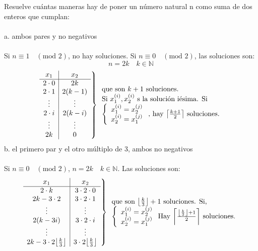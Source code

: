 \documentclass{article}
\DeclarePairedDelimiter{\ceil}{\lceil}{\rceil}
\DeclarePairedDelimiter{\floor}{\lfloor}{\rfloor}
\begin{document}
\section{}
Resuelve cuántas maneras hay de poner un número natural n como suma de dos enteros que cumplan:\\\\
a. ambos pares y no negativos\\\\
Si $n\equiv1 \quad (\text{mod }2)$, no hay soluciones. Si $n\equiv0 \quad (\text{mod }2)$, las soluciones son:
$$
n=2k \quad k \in \mathbb{N}
$$
$$
\left.\begin{array}{c|c}
    x_1 & x_2 \\ \hline
    2\cdot 0 & 2k \\
    2\cdot 1 & 2(k-1) \\
    \vdots & \vdots \\
    2\cdot i & 2(k-i) \\
    \vdots & \vdots \\
    2k & 0
\end{array} \right\}
\begin{array}{l}
    \text{que son } k+1 \text{ soluciones.}\\
    \text{Si } x_1^{(i)}, x_2^{(i)} \text{ s la solución iésima. Si}\\
    \left\{ \begin{array}{c}
        x_1^{(i)} = x_2^{(j)} \\
        x_2^{(i)} = x_1^{(j)}
    \end{array} \right.\text{, hay } \ceil*{\frac{k+1}{2}} \text{ soluciones.}
\end{array}
$$
b. el primero par y el otro múltiplo de 3, ambos no negativos\\\\
Si $n \equiv 0 \quad (\text{mod }2)$, $n=2k \quad k \in \mathbb{N}$. Las soluciones son:
$$
\left. \begin{array}{c|c}
    x_1 & x_2 \\ \hline
    2 \cdot k & 3\cdot 2 \cdot 0 \\
    2k-3\cdot2 & 3\cdot 2 \cdot 1\\
    \vdots & \vdots \\
    2(k-3i) & 3 \cdot 2 \cdot i \\
    \vdots & \vdots \\
    2k-3\cdot 2 \floor*{\frac{k}{3}} & 3\cdot 2 \floor*{\frac{k}{3}}
\end{array}\right\}
\begin{array}{l}
    \text{que son } \floor*{\frac{k}{3}} +1 \text{ soluciones. Si,} \\
     \left\{ \begin{array}{c}
        x_1^{(i)} = x_2^{(j)} \\
        x_2^{(i)} = x_1^{(j)}
    \end{array} \right. \text{Hay }\ceil*{\frac{\floor*{\frac{k}{3}} +1}{2}} \text{ soluciones.}
\end{array}
$$
\end{document}
